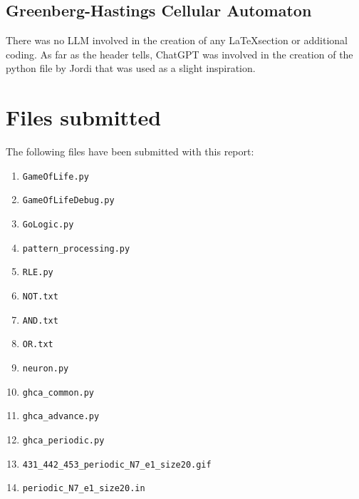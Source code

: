 \subsection{Greenberg-Hastings Cellular Automaton}
There was no LLM involved in the creation of any \LaTeX section or additional coding.
As far as the header tells, ChatGPT was involved in the creation of the python file by Jordi that was used as a slight inspiration.
\newpage
\section*{Files submitted}
The following files have been submitted with this report: \\
\begin{enumerate}
  \item \verb+GameOfLife.py+
  \item \verb+GameOfLifeDebug.py+
  \item \verb+GoLogic.py+
  \item \verb+pattern_processing.py+
  \item \verb+RLE.py+
  \item \verb+NOT.txt+
  \item \verb+AND.txt+
  \item \verb+OR.txt+
  \item \verb+neuron.py+
  \item \texttt{ghca\_common.py}
  \item \verb|ghca_advance.py|
  \item \verb|ghca_periodic.py|
  \item \verb|431_442_453_periodic_N7_e1_size20.gif|
  \item \verb|periodic_N7_e1_size20.in|
\end{enumerate}



